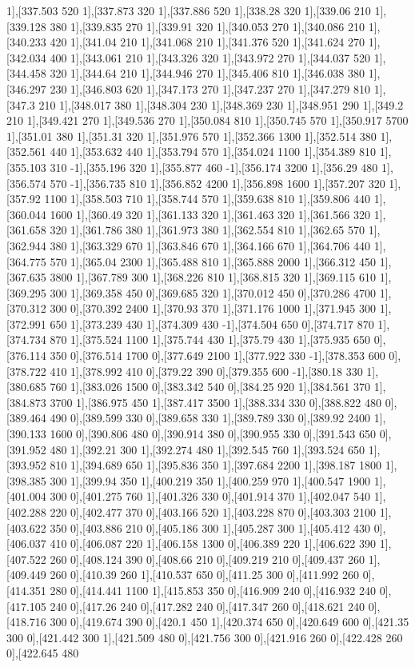 {1],[337.503 520 1],[337.873 320 1],[337.886 520 1],[338.28 320 1],[339.06 210 1],[339.128 380 1],[339.835 270 1],[339.91 320 1],[340.053 270 1],[340.086 210 1],[340.233 420 1],[341.04 210 1],[341.068 210 1],[341.376 520 1],[341.624 270 1],[342.034 400 1],[343.061 210 1],[343.326 320 1],[343.972 270 1],[344.037 520 1],[344.458 320 1],[344.64 210 1],[344.946 270 1],[345.406 810 1],[346.038 380 1],[346.297 230 1],[346.803 620 1],[347.173 270 1],[347.237 270 1],[347.279 810 1],[347.3 210 1],[348.017 380 1],[348.304 230 1],[348.369 230 1],[348.951 290 1],[349.2 210 1],[349.421 270 1],[349.536 270 1],[350.084 810 1],[350.745 570 1],[350.917 5700 1],[351.01 380 1],[351.31 320 1],[351.976 570 1],[352.366 1300 1],[352.514 380 1],[352.561 440 1],[353.632 440 1],[353.794 570 1],[354.024 1100 1],[354.389 810 1],[355.103 310 -1],[355.196 320 1],[355.877 460 -1],[356.174 3200 1],[356.29 480 1],[356.574 570 -1],[356.735 810 1],[356.852 4200 1],[356.898 1600 1],[357.207 320 1],[357.92 1100 1],[358.503 710 1],[358.744 570 1],[359.638 810 1],[359.806 440 1],[360.044 1600 1],[360.49 320 1],[361.133 320 1],[361.463 320 1],[361.566 320 1],[361.658 320 1],[361.786 380 1],[361.973 380 1],[362.554 810 1],[362.65 570 1],[362.944 380 1],[363.329 670 1],[363.846 670 1],[364.166 670 1],[364.706 440 1],[364.775 570 1],[365.04 2300 1],[365.488 810 1],[365.888 2000 1],[366.312 450 1],[367.635 3800 1],[367.789 300 1],[368.226 810 1],[368.815 320 1],[369.115 610 1],[369.295 300 1],[369.358 450 0],[369.685 320 1],[370.012 450 0],[370.286 4700 1],[370.312 300 0],[370.392 2400 1],[370.93 370 1],[371.176 1000 1],[371.945 300 1],[372.991 650 1],[373.239 430 1],[374.309 430 -1],[374.504 650 0],[374.717 870 1],[374.734 870 1],[375.524 1100 1],[375.744 430 1],[375.79 430 1],[375.935 650 0],[376.114 350 0],[376.514 1700 0],[377.649 2100 1],[377.922 330 -1],[378.353 600 0],[378.722 410 1],[378.992 410 0],[379.22 390 0],[379.355 600 -1],[380.18 330 1],[380.685 760 1],[383.026 1500 0],[383.342 540 0],[384.25 920 1],[384.561 370 1],[384.873 3700 1],[386.975 450 1],[387.417 3500 1],[388.334 330 0],[388.822 480 0],[389.464 490 0],[389.599 330 0],[389.658 330 1],[389.789 330 0],[389.92 2400 1],[390.133 1600 0],[390.806 480 0],[390.914 380 0],[390.955 330 0],[391.543 650 0],[391.952 480 1],[392.21 300 1],[392.274 480 1],[392.545 760 1],[393.524 650 1],[393.952 810 1],[394.689 650 1],[395.836 350 1],[397.684 2200 1],[398.187 1800 1],[398.385 300 1],[399.94 350 1],[400.219 350 1],[400.259 970 1],[400.547 1900 1],[401.004 300 0],[401.275 760 1],[401.326 330 0],[401.914 370 1],[402.047 540 1],[402.288 220 0],[402.477 370 0],[403.166 520 1],[403.228 870 0],[403.303 2100 1],[403.622 350 0],[403.886 210 0],[405.186 300 1],[405.287 300 1],[405.412 430 0],[406.037 410 0],[406.087 220 1],[406.158 1300 0],[406.389 220 1],[406.622 390 1],[407.522 260 0],[408.124 390 0],[408.66 210 0],[409.219 210 0],[409.437 260 1],[409.449 260 0],[410.39 260 1],[410.537 650 0],[411.25 300 0],[411.992 260 0],[414.351 280 0],[414.441 1100 1],[415.853 350 0],[416.909 240 0],[416.932 240 0],[417.105 240 0],[417.26 240 0],[417.282 240 0],[417.347 260 0],[418.621 240 0],[418.716 300 0],[419.674 390 0],[420.1 450 1],[420.374 650 0],[420.649 600 0],[421.35 300 0],[421.442 300 1],[421.509 480 0],[421.756 300 0],[421.916 260 0],[422.428 260 0],[422.645 480 }
